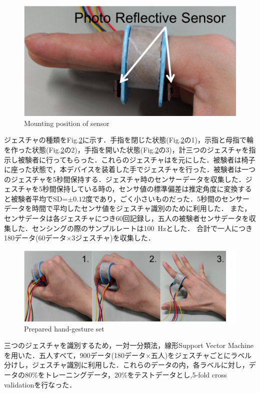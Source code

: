 \begin{figure}[H]
  \centering
  \includegraphics[width=0.6\linewidth]{fig/sensor}
  \caption{Mounting position of sensor}
  \label{fig:sensor}
\end{figure}

ジェスチャの種類をFig.\ref{fig:gesture}に示す．手指を閉じた状態(Fig.\ref{fig:gesture}の1)，示指と母指で輪を作った状態(Fig.\ref{fig:gesture}の2)，手指を開いた状態(Fig.\ref{fig:gesture}の3)，計三つのジェスチャを指示し被験者に行ってもらった．これらのジェスチャは\cite{Lin2015}を元にした．被験者は椅子に座った状態で，本デバイスを装着した手でジェスチャを行った．被験者は一つのジェスチャを5秒間保持する．ジェスチャ時のセンサーデータを収集した．ジェスチャを5秒間保持している時の，センサ値の標準偏差は推定角度に変換すると被験者平均でSD=$\pm0.12度$であり，ごく小さいものだった．5秒間のセンサーデータを時間で平均したセンサ値をジェスチャ識別のために利用した．
また，センサデータは各ジェスチャにつき60回記録し，五人の被験者センサデータを収集した．センシングの際のサンプルレートは100\ Hzとした．
合計で一人につき180データ(60データ$\times$3ジェスチャ)を収集した．

\begin{figure}[H]
  \centering
  \includegraphics[width=0.8\linewidth]{fig/gesture}
  \caption{Prepared hand-gesture set}
  \label{fig:gesture}
\end{figure}

三つのジェスチャを識別するため，一対一分類法，線形Support Vector Machineを用いた．五人すべて，900データ(180データ$\times$五人)をジェスチャごとにラベル分けし，ジェスチャ識別に利用した．これらのデータの内，各ラベルに対し，データの80\%をトレーニングデータ，20\%をテストデータとし,5-fold cross validationを行なった．


